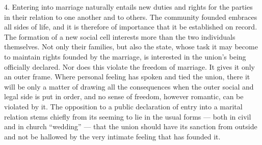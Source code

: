 \documentclass[12pt,a4paper,openany]{book}
\newcommand{\opage}[1]{\marginnote{\footnotesize\textit{[#1]}}}
\begin{document}
4. Entering into marriage naturally entails new duties and rights for the parties in their relation to one another and
to others. The community founded embraces all sides of life, and it is therefore of importance that it be established
on record. The formation of a new social cell interests more than the two individuals themselves. Not only their
families, but also the state, whose task it may become to maintain rights founded by the marriage, is interested in the
union's being officially declared. Nor does this violate the freedom of marriage. It gives it
\opage{304}only an outer frame. Where personal feeling has spoken and tied the union, there it will be only a matter of
drawing all the consequences when the outer social and legal side is put in order, and no sense of freedom, however
romantic, can be violated by it. The opposition to a public declaration of entry into a marital relation stems chiefly
from its seeming to lie in the usual forms --- both in civil and in church ``wedding'' --- that the union should have
its sanction from outside and not be hallowed by the very intimate feeling that has founded it.
\end{document}
